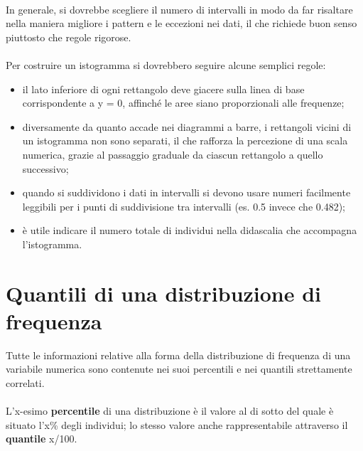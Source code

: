 \documentclass[10pt, draft]{book}
\begin{document}
\\
In generale, si dovrebbe scegliere il numero di intervalli in modo da far risaltare nella maniera migliore i pattern e le eccezioni nei dati, il che richiede buon senso piuttosto che regole rigorose.
\\
\\
Per costruire un istogramma si dovrebbero seguire alcune semplici regole:
\begin{itemize}
    \item il lato inferiore di ogni rettangolo deve giacere sulla linea di base corrispondente a y = 0, affinché le aree siano proporzionali alle frequenze;
    \item diversamente da quanto accade nei diagrammi a barre, i rettangoli vicini di un istogramma non sono separati, il che rafforza la percezione di una scala numerica, grazie al passaggio graduale da ciascun rettangolo a quello successivo;
    \item quando si suddividono i dati in intervalli si devono usare numeri facilmente leggibili per i punti di suddivisione tra intervalli (es. 0.5 invece che 0.482);
    \item è utile indicare il numero totale di individui nella didascalia che accompagna l'istogramma.
\end{itemize}

\section{Quantili di una distribuzione di frequenza}
Tutte le informazioni relative alla forma della distribuzione di frequenza di una variabile numerica sono contenute nei suoi percentili e nei quantili strettamente correlati. 
\\
\\
L'x-esimo \textbf{percentile} di una distribuzione è il valore al di sotto del quale è situato l'x\% degli individui; lo stesso valore anche rappresentabile attraverso il \textbf{quantile} x/100.
\end{document}

